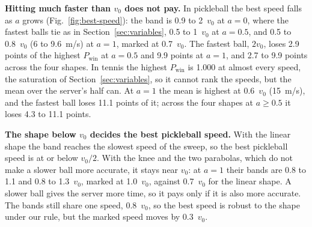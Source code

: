 
  \textbf{Hitting much faster than $v_0$ does not pay.} In pickleball the best
  speed falls as $a$ grows (Fig.~\ref{fig:best-speed}): the band is 0.9 to
  2~$v_0$ at $a = 0$, where the fastest balls tie as in
  Section~\ref{sec:variables}, 0.5 to 1~$v_0$ at $a = 0.5$, and 0.5 to
  0.8~$v_0$ (6 to 9.6~m/s) at $a = 1$, marked at 0.7~$v_0$. The fastest ball,
  $2 v_0$, loses 2.9 points of the highest $P_{\mathrm{win}}$ at $a = 0.5$ and
  9.9 points at $a = 1$, and 2.7 to 9.9 points across the four shapes. In tennis
  the highest $P_{\mathrm{win}}$ is 1.000 at almost every speed, the saturation
  of Section~\ref{sec:variables}, so it cannot rank the speeds, but the mean
  over the server's half can. At $a = 1$ the mean is highest at 0.6~$v_0$
  (15~m/s), and the fastest ball loses 11.1 points of it; across the four shapes
  at $a \ge 0.5$ it loses 4.3 to 11.1 points.

  \textbf{The shape below $v_0$ decides the best pickleball speed.} With the
  linear shape the band reaches the slowest speed of the sweep, so the best
  pickleball speed is at or below $v_0 / 2$. With the knee and the two
  parabolas, which do not make a slower ball more accurate, it stays near
  $v_0$: at $a = 1$ their bands are 0.8 to 1.1 and 0.8 to 1.3~$v_0$, marked at
  1.0~$v_0$, against 0.7~$v_0$ for the linear shape. A slower ball gives the
  server more time, so it pays only if it is also more accurate. The bands still
  share one speed, 0.8~$v_0$, so the best speed is robust to the shape under our
  rule, but the marked speed moves by 0.3~$v_0$.


